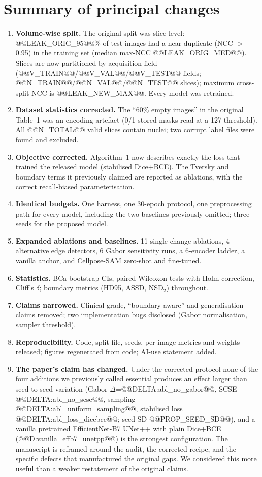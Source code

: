 \documentclass[11pt]{article}
\begin{document}
\section{Summary of principal changes}
\begin{enumerate}[nosep]
\item \textbf{Volume-wise split.} The original split was slice-level: @@LEAK_ORIG_95@@\% of test images had a near-duplicate (NCC $>$0.95) in the training set (median max-NCC @@LEAK_ORIG_MED@@). Slices are now partitioned by acquisition field (@@V_TRAIN@@/@@V_VAL@@/@@V_TEST@@ fields; @@N_TRAIN@@/@@N_VAL@@/@@N_TEST@@ slices); maximum cross-split NCC is @@LEAK_NEW_MAX@@. Every model was retrained.
\item \textbf{Dataset statistics corrected.} The ``60\% empty images'' in the original Table~1 was an encoding artefact (0/1-stored masks read at a 127 threshold). All @@N_TOTAL@@ valid slices contain nuclei; two corrupt label files were found and excluded.
\item \textbf{Objective corrected.} Algorithm~1 now describes exactly the loss that trained the released model (stabilised Dice+BCE). The Tversky and boundary terms it previously claimed are reported as ablations, with the correct recall-biased parameterisation.
\item \textbf{Identical budgets.} One harness, one 30-epoch protocol, one preprocessing path for every model, including the two baselines previously omitted; three seeds for the proposed model.
\item \textbf{Expanded ablations and baselines.} 11 single-change ablations, 4 alternative edge detectors, 6 Gabor sensitivity runs, a 6-encoder ladder, a vanilla anchor, and Cellpose-SAM zero-shot and fine-tuned.
\item \textbf{Statistics.} BCa bootstrap CIs, paired Wilcoxon tests with Holm correction, Cliff's $\delta$; boundary metrics (HD95, ASSD, NSD$_2$) throughout.
\item \textbf{Claims narrowed.} Clinical-grade, ``boundary-aware'' and generalisation claims removed; two implementation bugs disclosed (Gabor normalisation, sampler threshold).
\item \textbf{Reproducibility.} Code, split file, seeds, per-image metrics and weights released; figures regenerated from code; AI-use statement added.
\item \textbf{The paper's claim has changed.} Under the corrected protocol none of the four additions we previously called essential produces an effect larger than seed-to-seed variation (Gabor $\Delta$=@@DELTA:abl_no_gabor@@, SCSE @@DELTA:abl_no_scse@@, sampling @@DELTA:abl_uniform_sampling@@, stabilised loss @@DELTA:abl_loss_dicebce@@; seed SD @@PROP_SEED_SD@@), and a vanilla pretrained EfficientNet-B7 UNet++ with plain Dice+BCE (@@D:vanilla_effb7_unetpp@@) is the strongest configuration. The manuscript is reframed around the audit, the corrected recipe, and the specific defects that manufactured the original gaps. We considered this more useful than a weaker restatement of the original claims.
\end{enumerate}
\end{document}
